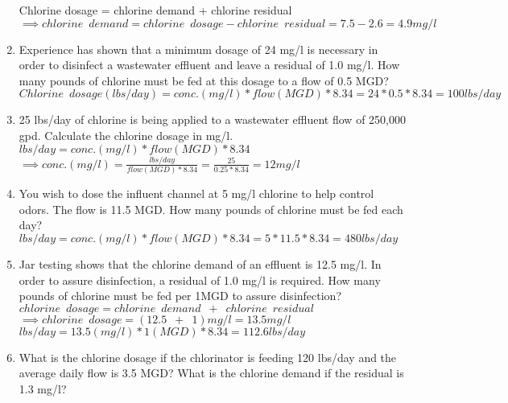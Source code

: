 \documentclass{article}
\begin{document}
\begin{enumerate}
\vspace{0.25cm}
Chlorine dosage = chlorine demand + chlorine residual\\
\vspace{0.25cm}
$ \implies chlorine \enspace demand = chlorine \enspace dosage - chlorine \enspace residual=7.5-2.6=\boxed{4.9mg/l}$\\
\vspace{0.25cm}
\item Experience has shown that a minimum dosage of 24 mg/l is necessary in order to disinfect a wastewater effluent and leave a residual of 1.0 mg/l. How many pounds of chlorine must be fed at this dosage to a flow of 0.5 MGD?\\
\vspace{0.2cm}
$Chlorine \enspace dosage (lbs/day)=conc. (mg/l)*flow(MGD)*8.34=24*0.5*8.34=\boxed{100lbs/day}$\\
\vspace{0.25cm}
\item 25 lbs/day of chlorine is being applied to a wastewater effluent flow of 250,000 gpd. Calculate the chlorine dosage in mg/l.\\
\vspace{0.25cm}
$lbs/day=conc. (mg/l)*flow(MGD)*8.34$\\
$\implies conc. (mg/l)=\frac{lbs/day}{flow(MGD)*8.34}=\frac{25}{0.25*8.34}=\boxed{12mg/l}$\\
\vspace{0.25cm}
\item You wish to dose the influent channel at 5 mg/l chlorine to help control odors. The flow is 11.5 MGD. How many pounds of chlorine must be fed each day?\\

$lbs/day=conc. (mg/l)*flow(MGD)*8.34=5*11.5*8.34=\boxed{480lbs/day}$\\

\item Jar testing shows that the chlorine demand of an effluent is 12.5 mg/l. In order to assure disinfection, a residual of 1.0 mg/l is required. How many pounds of chlorine must be fed per 1MGD to assure disinfection?\\
\vspace{0.2cm}
$ chlorine \enspace dosage = chlorine \enspace demand \enspace + \enspace chlorine \enspace residual$\\
\vspace{0.25cm}
$\implies chlorine \enspace dosage = (12.5 \enspace + \enspace 1 )mg/l=13.5 mg/l$\\
\vspace{0.25cm}
$lbs/day=13.5(mg/l)*1(MGD)*8.34=\boxed{112.6 lbs/day}$
\item What is the chlorine dosage if the chlorinator is feeding 120 lbs/day and the average daily flow is 3.5 MGD?  What is the chlorine demand if the residual is 1.3 mg/l?\\


\end{enumerate}
\end{document}
